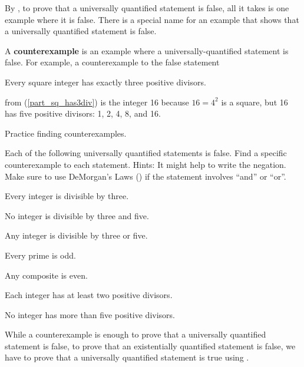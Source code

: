 By , to prove that a universally quantified statement is false, all it takes is one example where it is false.  There is a special name for an example that shows that a universally quantified statement is false.

\begin{defn}[Counterexample]
\label{defn_cex}  
    A \textbf{counterexample} is an example where a universally-quantified statement is false.  For example, a counterexample to the false statement 
        \begin{center}
            Every square integer has exactly three positive divisors.
        \end{center} 
    from  (\ref{part_sq_has3div}) is the integer 16 because $16=4^2$ is a square, but 16 has five positive divisors: 1, 2, 4, 8, and 16.
\end{defn}

Practice finding counterexamples.

\begin{act}[Counterexamples]
\label{act_cex_my_first}
    Each of the following universally quantified statements is false. Find a specific counterexample to each statement.  Hints: It might help to write the negation.  Make sure to use DeMorgan's Laws () if the statement involves ``and'' or ``or''.

        \begin{actpart}
            \item Every integer is divisible by three.         
            \item No integer is divisible by three and five.
            \item Any integer is divisible by three or five. 
            \item Every prime is odd.
            \item Any composite is even. 
            \item Each integer has at least two positive divisors.
            \item No integer has more than five positive divisors. 
        \end{actpart}
\end{act}

While a counterexample is enough to prove that a universally quantified statement is false, to prove that an existentially quantified statement is false, we have to prove that a universally quantified statement is true using .

